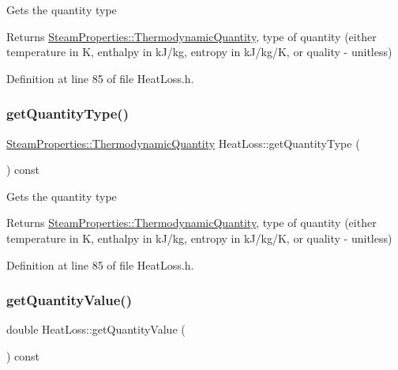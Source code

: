 Gets the quantity type \begin{DoxyReturn}{Returns}
\hyperlink{class_steam_properties_ae0294bedf7d178c2d8fb6aed0f62fbff}{Steam\+Properties\+::\+Thermodynamic\+Quantity}, type of quantity (either temperature in K, enthalpy in k\+J/kg, entropy in k\+J/kg/K, or quality -\/ unitless) 
\end{DoxyReturn}


Definition at line 85 of file Heat\+Loss.\+h.

\mbox{\label{class_heat_loss_a92dc973c0fd81df192207b3df55d6c2b}} 
\subsubsection{\texorpdfstring{get\+Quantity\+Type()}{getQuantityType()}\hspace{0.1cm}{\footnotesize\ttfamily [3/3]}}
{\footnotesize\ttfamily \hyperlink{class_steam_properties_ae0294bedf7d178c2d8fb6aed0f62fbff}{Steam\+Properties\+::\+Thermodynamic\+Quantity} Heat\+Loss\+::get\+Quantity\+Type (\begin{DoxyParamCaption}{ }\end{DoxyParamCaption}) const\hspace{0.3cm}{\ttfamily [inline]}}

Gets the quantity type \begin{DoxyReturn}{Returns}
\hyperlink{class_steam_properties_ae0294bedf7d178c2d8fb6aed0f62fbff}{Steam\+Properties\+::\+Thermodynamic\+Quantity}, type of quantity (either temperature in K, enthalpy in k\+J/kg, entropy in k\+J/kg/K, or quality -\/ unitless) 
\end{DoxyReturn}


Definition at line 85 of file Heat\+Loss.\+h.

\mbox{\label{class_heat_loss_a7f7fd85e4fc8bf96dcc213f3dd44ecf7}} 
\subsubsection{\texorpdfstring{get\+Quantity\+Value()}{getQuantityValue()}\hspace{0.1cm}{\footnotesize\ttfamily [1/3]}}
{\footnotesize\ttfamily double Heat\+Loss\+::get\+Quantity\+Value (\begin{DoxyParamCaption}{ }\end{DoxyParamCaption}) const\hspace{0.3cm}{\ttfamily [inline]}}

